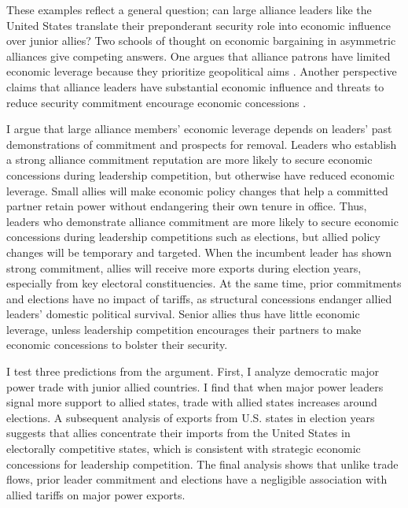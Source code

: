 \documentclass[12pt]{article}
\begin{document}


These examples reflect a general question; can large alliance leaders like the United States translate their preponderant security role into economic influence over junior allies? 
Two schools of thought on economic bargaining in asymmetric alliances give competing answers. 
One argues that alliance patrons have limited economic leverage because they prioritize geopolitical aims \citep{Drezner2013, WolfordKim2017}.
Another perspective claims that alliance leaders have substantial economic influence \citep{Norrlof2010, Brooksetal2013} and threats to reduce security commitment encourage economic concessions \citep[pg. 122]{Oatley2015}. 


I argue that large alliance members' economic leverage depends on leaders' past demonstrations of commitment and prospects for removal.
Leaders who establish a strong alliance commitment reputation are more likely to secure economic concessions during leadership competition, but otherwise have reduced economic leverage.
Small allies will make economic policy changes that help a committed partner retain power without endangering their own tenure in office.  
Thus, leaders who demonstrate alliance commitment are more likely to secure economic concessions during leadership competitions such as elections, but allied policy changes will be temporary and targeted.
When the incumbent leader has shown strong commitment, allies will receive more exports during election years, especially from key electoral constituencies. 
At the same time, prior commitments and elections have no impact of tariffs, as structural concessions endanger allied leaders' domestic political survival. 
Senior allies thus have little economic leverage, unless leadership competition encourages their partners to make economic concessions to bolster their security. 


I test three predictions from the argument.
First, I analyze democratic major power trade with junior allied countries. 
I find that when major power leaders signal more support to allied states, trade with allied states increases around elections. 
A subsequent analysis of exports from U.S. states in election years suggests that allies concentrate their imports from the United States in electorally competitive states, which is consistent with strategic economic concessions for leadership competition.
The final analysis shows that unlike trade flows, prior leader commitment and elections have a negligible association with allied tariffs on major power exports. 
\end{document}
